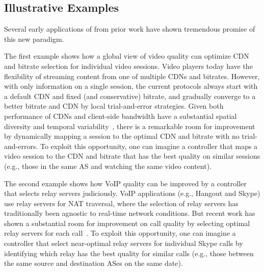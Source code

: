 \subsection{Illustrative Examples}
\label{subsec:overview:examples}

Several early applications of \ddn from prior work have shown 
tremendous promise of this new paradigm.

The first example shows how a global view of video quality 
can optimize CDN and bitrate selection for individual video 
sessions. 
Video players today have the flexibility of streaming content 
from one of multiple CDNs and bitrates. However, with
only information on a single session, the current protocols 
always start with a default CDN and fixed (and conservative) 
bitrate, and gradually converge to a better bitrate and 
CDN by local trial-and-error strategies.
Given both performance of CDNs and client-side bandwidth 
have a substantial spatial diversity
  and temporal variability~\cite{sigcomm12}, there is a
remarkable room for improvement by dynamically mapping a 
session to the optimal CDN and bitrate with no trial-and-errors.
To exploit this opportunity, one can imagine a \ddn controller
that maps a video session  to the CDN and bitrate that has 
the best quality on similar sessions (e.g.,
those in the same AS and watching the same video content).


The second example shows how VoIP quality can be improved by 
a \ddn controller that selects relay servers judiciously.
VoIP applications (e.g., Hangout and Skype) use relay servers 
for NAT traversal, where the selection of relay servers 
has traditionally been agnostic to real-time network conditions. 
But recent work has shown a
substantial room for improvement on call quality by selecting 
optimal relay servers for each
call~\cite{rewan-hotnets2015}. 
To exploit this opportunity, one can imagine a \ddn controller
that select near-optimal relay servers for individual Skype calls 
by identifying which relay has the best quality for similar calls 
(e.g., those between the same source and destination ASes 
on the same date).


